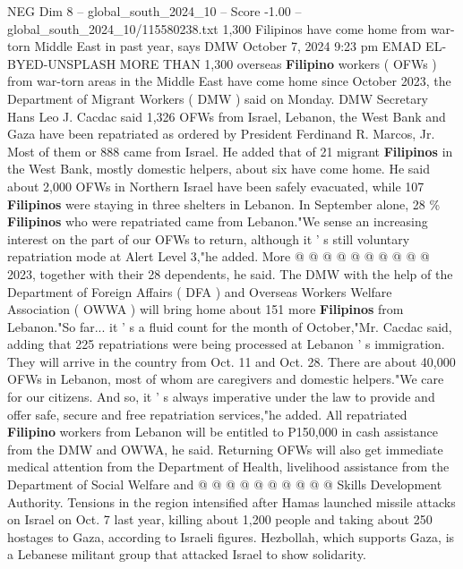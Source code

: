 \begin{textsample}{NEG Dim 8 – global\_south\_2024\_10 – Score -1.00 – global\_south\_2024\_10/115580238.txt}  \label{ex:f8_neg_145}
1,300 Filipinos have come home from war-torn Middle East in past year, says DMW October 7, 2024 9:23 pm EMAD EL-BYED-UNSPLASH MORE THAN 1,300 overseas \textbf{Filipino} workers ( OFWs ) from war-torn areas in the Middle East have come home since October 2023, the Department of Migrant Workers ( DMW ) said on Monday.
DMW Secretary Hans Leo J.
Cacdac said 1,326 OFWs from Israel, Lebanon, the West Bank and Gaza have been repatriated as ordered by President Ferdinand R.
Marcos, Jr.
Most of them or 888 came from Israel.
He added that of 21 migrant \textbf{Filipinos} in the West Bank, mostly domestic helpers, about six have come home.
He said about 2,000 OFWs in Northern Israel have been safely evacuated, while 107 \textbf{Filipinos} were staying in three shelters in Lebanon.
In September alone, 28 \% \textbf{Filipinos} who were repatriated came from Lebanon."We sense an increasing interest on the part of our OFWs to return, although it ' s still voluntary repatriation mode at Alert Level 3,"he added.
More @ @ @ @ @ @ @ @ @ @ 2023, together with their 28 dependents, he said.
The DMW with the help of the Department of Foreign Affairs ( DFA ) and Overseas Workers Welfare Association ( OWWA ) will bring home about 151 more \textbf{Filipinos} from Lebanon."So far... it ' s a fluid count for the month of October,"Mr.
Cacdac said, adding that 225 repatriations were being processed at Lebanon ' s immigration.
They will arrive in the country from Oct. 11 and Oct. 28.
There are about 40,000 OFWs in Lebanon, most of whom are caregivers and domestic helpers."We care for our citizens.
And so, it ' s always imperative under the law to provide and offer safe, secure and free repatriation services,"he added.
All repatriated \textbf{Filipino} workers from Lebanon will be entitled to P150,000 in cash assistance from the DMW and OWWA, he said.
Returning OFWs will also get immediate medical attention from the Department of Health, livelihood assistance from the Department of Social Welfare and @ @ @ @ @ @ @ @ @ @ Skills Development Authority.
Tensions in the region intensified after Hamas launched missile attacks on Israel on Oct. 7 last year, killing about 1,200 people and taking about 250 hostages to Gaza, according to Israeli figures.
Hezbollah, which supports Gaza, is a Lebanese militant group that attacked Israel to show solidarity.

\end{textsample}

